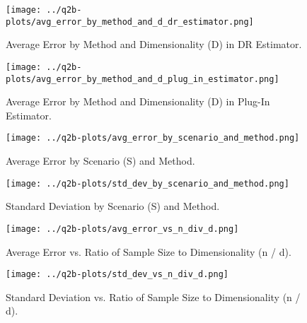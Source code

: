\documentclass{article}
\begin{document}
{\begin{figure}[H]
  \centering
  \texttt{[image: ../q2b-plots/avg\_error\_by\_method\_and\_d\_dr\_estimator.png]}
  \caption{Average Error by Method and Dimensionality (D) in DR Estimator.}
\end{figure}

\begin{figure}[H]
  \centering
  \texttt{[image: ../q2b-plots/avg\_error\_by\_method\_and\_d\_plug\_in\_estimator.png]}
  \caption{Average Error by Method and Dimensionality (D) in Plug-In Estimator.}
\end{figure}

\begin{figure}[H]
  \centering
  \texttt{[image: ../q2b-plots/avg\_error\_by\_scenario\_and\_method.png]}
  \caption{Average Error by Scenario (S) and Method.}
\end{figure}

\begin{figure}[H]
  \centering
  \texttt{[image: ../q2b-plots/std\_dev\_by\_scenario\_and\_method.png]}
  \caption{Standard Deviation by Scenario (S) and Method.}
\end{figure}

\begin{figure}[H]
  \centering
  \texttt{[image: ../q2b-plots/avg\_error\_vs\_n\_div\_d.png]}
  \caption{Average Error vs. Ratio of Sample Size to Dimensionality (n / d).}
\end{figure}

\begin{figure}[H]
  \centering
  \texttt{[image: ../q2b-plots/std\_dev\_vs\_n\_div\_d.png]}
  \caption{Standard Deviation vs. Ratio of Sample Size to Dimensionality (n / d).}
\end{figure}
}{}
\end{document}
